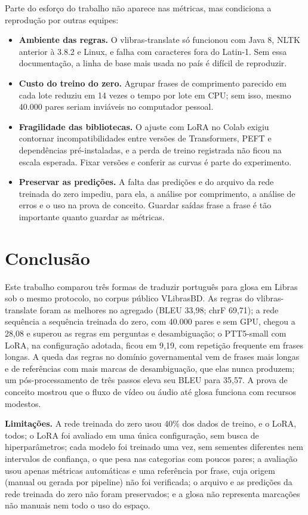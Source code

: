 \documentclass[12pt]{article}
\newcommand{\gl}[1]{\textsf{\small #1}}
\begin{document}
Parte do esforço do trabalho não aparece nas métricas, mas condiciona a reprodução por outras equipes:
\begin{itemize}
\item \textbf{Ambiente das regras.} O \gl{vlibras-translate} só funcionou com Java 8, NLTK anterior à 3.8.2 e Linux, e falha com caracteres fora do Latin-1. Sem essa documentação, a linha de base mais usada no país é difícil de reproduzir.
\item \textbf{Custo do treino do zero.} Agrupar frases de comprimento parecido em cada lote reduziu em 14 vezes o tempo por lote em CPU; sem isso, mesmo 40.000 pares seriam inviáveis no computador pessoal.
\item \textbf{Fragilidade das bibliotecas.} O ajuste com LoRA no Colab exigiu contornar incompatibilidades entre versões de Transformers, PEFT e dependências pré-instaladas, e a perda de treino registrada não ficou na escala esperada. Fixar versões e conferir as curvas é parte do experimento.
\item \textbf{Preservar as predições.} A falta das predições e do arquivo da rede treinada do zero impediu, para ela, a análise por comprimento, a análise de erros e o uso na prova de conceito. Guardar saídas frase a frase é tão importante quanto guardar as métricas.
\end{itemize}

\section{Conclusão}

Este trabalho comparou três formas de traduzir português para glosa em Libras sob o mesmo protocolo, no corpus público VLibrasBD. As regras do \gl{vlibras-translate} foram as melhores no agregado (BLEU 33,98; chrF 69,71); a rede sequência a sequência treinada do zero, com 40.000 pares e sem GPU, chegou a 28,08 e superou as regras em perguntas e desambiguação; o PTT5-small com LoRA, na configuração adotada, ficou em 9,19, com repetição frequente em frases longas. A queda das regras no domínio governamental vem de frases mais longas e de referências com mais marcas de desambiguação, que elas nunca produzem; um pós-processamento de três passos eleva seu BLEU para 35,57. A prova de conceito mostrou que o fluxo de vídeo ou áudio até glosa funciona com recursos modestos.

\textbf{Limitações.} A rede treinada do zero usou 40\% dos dados de treino, e o LoRA, todos; o LoRA foi avaliado em uma única configuração, sem busca de hiperparâmetros; cada modelo foi treinado uma vez, sem sementes diferentes nem intervalos de confiança, o que pesa nas categorias com poucos pares; a avaliação usou apenas métricas automáticas e uma referência por frase, cuja origem (manual ou gerada por pipeline) não foi verificada; o arquivo e as predições da rede treinada do zero não foram preservados; e a glosa não representa marcações não manuais nem todo o uso do espaço.
\end{document}
